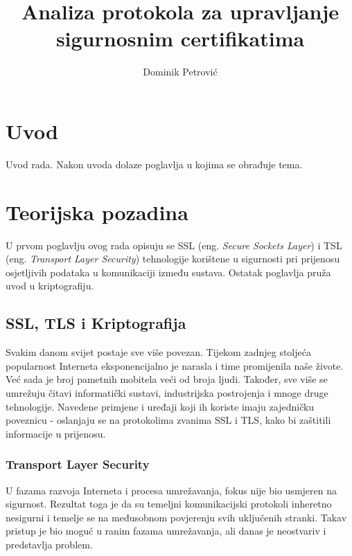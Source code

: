 \documentclass[times, utf8, diplomski]{fer}
\begin{document}

\title{Analiza protokola za upravljanje sigurnosnim certifikatima}

\author{Dominik Petrović}

\maketitle

\izvornik


\tableofcontents

\chapter{Uvod}
Uvod rada. Nakon uvoda dolaze poglavlja u kojima se obrađuje tema.

\chapter{Teorijska pozadina}
U prvom poglavlju ovog rada opisuju se SSL (eng. \textit{Secure Sockets Layer}) i TSL (eng. \textit{Transport Layer Security}) tehnologije korištene u sigurnosti pri prijenosu osjetljivih podataka u komunikaciji između sustava. Ostatak poglavlja pruža uvod u kriptografiju.


\section{SSL, TLS i Kriptografija}
Svakim danom svijet postaje sve više povezan. Tijekom zadnjeg stoljeća popularnost Interneta eksponencijalno je narasla i time promijenila naše živote. Već sada je broj pametnih mobitela veći od broja ljudi. Također, sve više se umrežuju čitavi informatički sustavi, industrijska postrojenja i mnoge druge tehnologije. Navedene primjene i uređaji koji ih koriste imaju zajedničku poveznicu - oslanjaju se na protokolima zvanima SSL i TLS, kako bi zaštitili informacije u prijenosu.


\subsection{Transport Layer Security}
U fazama razvoja Interneta i procesa umrežavanja, fokus nije bio usmjeren na sigurnost. Rezultat toga je da su temeljni komunikacijski protokoli inheretno nesigurni i temelje se na međusobnom povjerenju svih uključenih stranki. Takav pristup je bio moguć u ranim fazama umrežavanja, ali danas je neostvariv i predstavlja problem.
\end{document}
